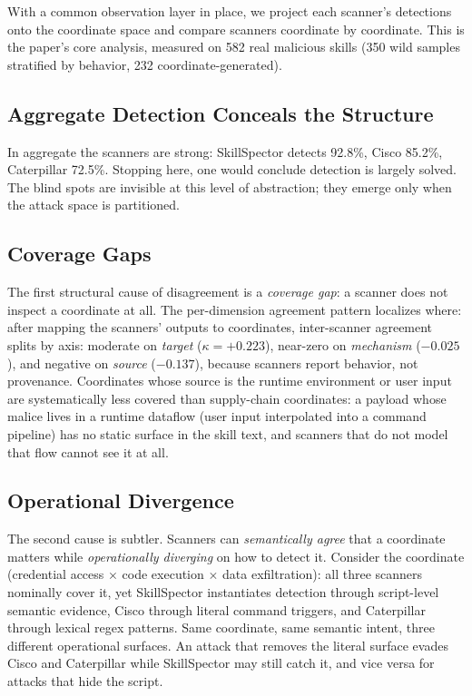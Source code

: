 \documentclass[sigconf,nonacm]{acmart}
\begin{document}
With a common observation layer in place, we project each scanner's detections onto the coordinate space and compare scanners coordinate by coordinate. This is the paper's core analysis, measured on 582 real malicious skills (350 wild samples stratified by behavior, 232 coordinate-generated).

\subsection{Aggregate Detection Conceals the Structure}
In aggregate the scanners are strong: SkillSpector detects 92.8\%, Cisco 85.2\%, Caterpillar 72.5\%. Stopping here, one would conclude detection is largely solved. The blind spots are invisible at this level of abstraction; they emerge only when the attack space is partitioned.

\subsection{Coverage Gaps}
The first structural cause of disagreement is a \emph{coverage gap}: a scanner does not inspect a coordinate at all. The per-dimension agreement pattern localizes where: after mapping the scanners' outputs to coordinates, inter-scanner agreement splits by axis: moderate on \emph{target} ($\kappa=+0.223$), near-zero on \emph{mechanism} ($-0.025$), and negative on \emph{source} ($-0.137$), because scanners report behavior, not provenance. Coordinates whose source is the runtime environment or user input are systematically less covered than supply-chain coordinates: a payload whose malice lives in a runtime dataflow (user input interpolated into a command pipeline) has no static surface in the skill text, and scanners that do not model that flow cannot see it at all.

\subsection{Operational Divergence}
The second cause is subtler. Scanners can \emph{semantically agree} that a coordinate matters while \emph{operationally diverging} on how to detect it. Consider the coordinate (credential access $\times$ code execution $\times$ data exfiltration): all three scanners nominally cover it, yet SkillSpector instantiates detection through script-level semantic evidence, Cisco through literal command triggers, and Caterpillar through lexical regex patterns. Same coordinate, same semantic intent, three different operational surfaces. An attack that removes the literal surface evades Cisco and Caterpillar while SkillSpector may still catch it, and vice versa for attacks that hide the script.
\end{document}
